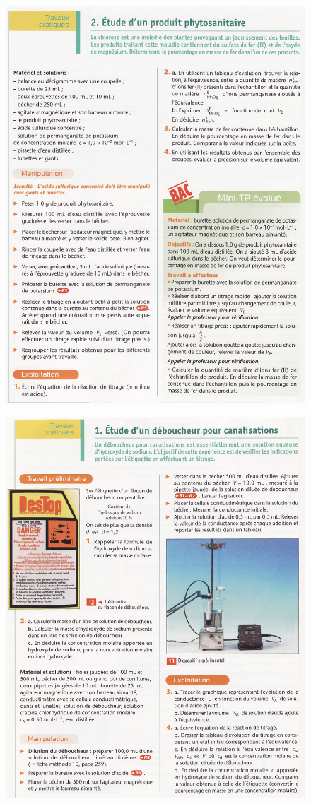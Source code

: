 \documentclass[11pt,a4paper]{article}
\begin{document}
\begin{figure}[h]
    \centering
    \includegraphics[width=\linewidth]{imgs/c1/xo6.jpg}
\end{figure} 

\begin{figure}[h]
    \centering
    \includegraphics[width=\linewidth]{imgs/c1/xo7.jpg}
\end{figure} 
\end{document}
